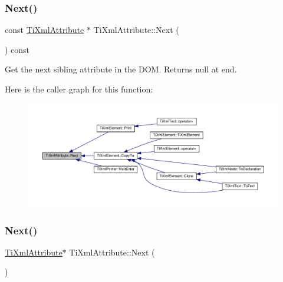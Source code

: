 \subsubsection{\texorpdfstring{Next()}{Next()}\hspace{0.1cm}{\footnotesize\ttfamily [1/2]}}
{\footnotesize\ttfamily const \hyperlink{class_ti_xml_attribute}{Ti\+Xml\+Attribute} $\ast$ Ti\+Xml\+Attribute\+::\+Next (\begin{DoxyParamCaption}{ }\end{DoxyParamCaption}) const}



Get the next sibling attribute in the D\+OM. Returns null at end. 

Here is the caller graph for this function\+:\nopagebreak
\begin{figure}[H]
\begin{center}
\leavevmode
\includegraphics[width=350pt]{class_ti_xml_attribute_af2e78f1ba9ed56a26ddc80614ed1c393_icgraph}
\end{center}
\end{figure}
\mbox{\label{class_ti_xml_attribute_a138320aa7793b148ba7e5bd0a0ea4db6}} 
\subsubsection{\texorpdfstring{Next()}{Next()}\hspace{0.1cm}{\footnotesize\ttfamily [2/2]}}
{\footnotesize\ttfamily \hyperlink{class_ti_xml_attribute}{Ti\+Xml\+Attribute}$\ast$ Ti\+Xml\+Attribute\+::\+Next (\begin{DoxyParamCaption}{ }\end{DoxyParamCaption})\hspace{0.3cm}{\ttfamily [inline]}}

\mbox{\label{class_ti_xml_attribute_a80dcb758cc5ab27ce9865301e2da1335}} 
